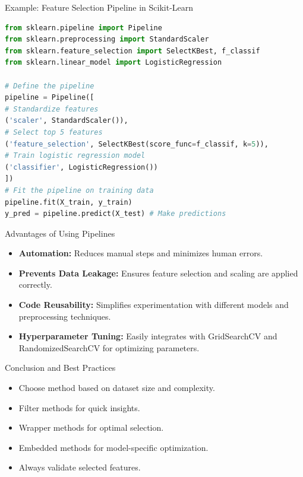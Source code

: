 \documentclass[11pt]{beamer}
\begin{document}
\begin{frame}[fragile]{Example: Feature Selection Pipeline in Scikit-Learn}
\footnotesize{
    \begin{lstlisting}[language=Python]
from sklearn.pipeline import Pipeline
from sklearn.preprocessing import StandardScaler
from sklearn.feature_selection import SelectKBest, f_classif
from sklearn.linear_model import LogisticRegression

# Define the pipeline
pipeline = Pipeline([
# Standardize features
('scaler', StandardScaler()),  
# Select top 5 features
('feature_selection', SelectKBest(score_func=f_classif, k=5)), 
# Train logistic regression model 
('classifier', LogisticRegression()) 
])
# Fit the pipeline on training data
pipeline.fit(X_train, y_train)    
y_pred = pipeline.predict(X_test) # Make predictions
    \end{lstlisting}
}
\end{frame}
\begin{frame}{Advantages of Using Pipelines}
    \begin{itemize}
        \item \textbf{Automation:} Reduces manual steps and minimizes human errors.
        \item \textbf{Prevents Data Leakage:} Ensures feature selection and scaling are applied correctly.
        \item \textbf{Code Reusability:} Simplifies experimentation with different models and preprocessing techniques.
        \item \textbf{Hyperparameter Tuning:} Easily integrates with GridSearchCV and RandomizedSearchCV for optimizing parameters.
    \end{itemize}
\end{frame}
\begin{frame}{Conclusion and Best Practices}
    \begin{itemize}
        \item Choose method based on dataset size and complexity.
        \item Filter methods for quick insights.
        \item Wrapper methods for optimal selection.
        \item Embedded methods for model-specific optimization.
        \item Always validate selected features.
    \end{itemize}
\end{frame}
\end{document}
